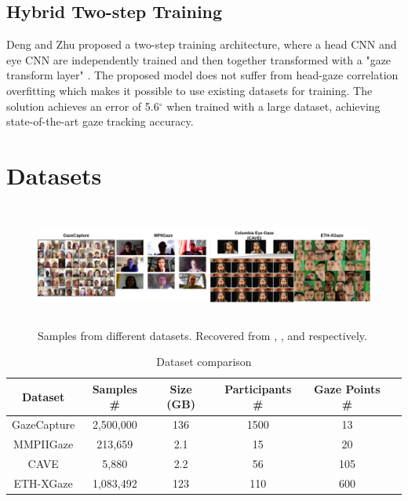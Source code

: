 \subsection{Hybrid Two-step Training}
Deng and Zhu proposed a two-step training architecture, where a head CNN and eye CNN are independently trained and then together transformed with a "gaze transform layer" \cite{deng_monocular_2017}. The proposed model does not suffer from head-gaze correlation overfitting which makes it possible to use existing datasets for training. The solution achieves an error of 5.6$^{\circ}$ when trained with a large dataset, achieving state-of-the-art gaze tracking accuracy. 

\section{Datasets}
\label{state-art-datasets}


\begin{figure}
    \centering
    \includegraphics[width=\textwidth,height=4cm]{img/figures/datasets.png}
    \caption{Samples from different datasets. Recovered from \cite{GazeCapture}, \cite{GazeEstimationInTheWild}, \cite{CAVE_0324} and \cite{Zhang2020ETHXGaze} respectively. }
    \label{Datasets}
 \end{figure}

 \begin{table}[h!]
    \caption{Dataset comparison}
    \centering
    \label{tab:dataset}
    \begin{tabular}{c c c c c c}
    \hline\hline
    Dataset & Samples \# & Size (GB) & Participants \# & Gaze Points \# \\
    \hline\hline
        GazeCapture & 2,500,000 & 136 & 1500 & 13 \\
        MMPIIGaze & 213,659 & 2.1 & 15 & 20 \\
        CAVE & 5,880 & 2.2 & 56 & 105 \\
        ETH-XGaze & 1,083,492 & 123 & 110 & 600 \\ [1ex]
    \hline
    \end{tabular}
\end{table}

